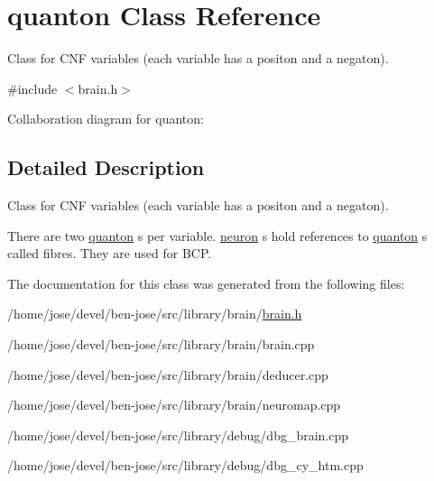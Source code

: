 \hypertarget{classquanton}{}\section{quanton Class Reference}
\label{classquanton}


Class for C\+NF variables (each variable has a positon and a negaton).  




{\ttfamily \#include $<$brain.\+h$>$}



Collaboration diagram for quanton\+:


\subsection{Detailed Description}
Class for C\+NF variables (each variable has a positon and a negaton). 

There are two \hyperlink{classquanton}{quanton} s per variable. \hyperlink{classneuron}{neuron} s hold references to \hyperlink{classquanton}{quanton} s called fibres. They are used for B\+CP. 

The documentation for this class was generated from the following files\+:\begin{DoxyCompactItemize}
\item 
/home/jose/devel/ben-\/jose/src/library/brain/\hyperlink{brain_8h}{brain.\+h}\item 
/home/jose/devel/ben-\/jose/src/library/brain/brain.\+cpp\item 
/home/jose/devel/ben-\/jose/src/library/brain/deducer.\+cpp\item 
/home/jose/devel/ben-\/jose/src/library/brain/neuromap.\+cpp\item 
/home/jose/devel/ben-\/jose/src/library/debug/dbg\+\_\+brain.\+cpp\item 
/home/jose/devel/ben-\/jose/src/library/debug/dbg\+\_\+cy\+\_\+htm.\+cpp\end{DoxyCompactItemize}
